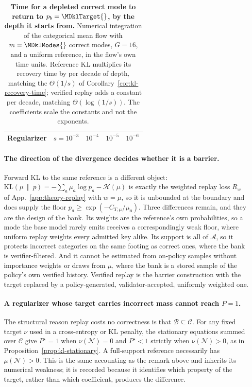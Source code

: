 \documentclass{article}
\newcommand{\1}{\mathbf 1}
\theoremstyle{remark}
\theoremstyle{definition}
\theoremstyle{plain}
\begin{document}
\begin{table}[t]
  \centering
  \caption{\textbf{Time for a depleted correct mode to return to
  $p_b=\MDklTarget{}$, by the depth it starts from.} Numerical integration of
  the categorical mean flow with $m=\MDklModes{}$ correct modes, $G=16$, and a
  uniform reference, in the flow's own time units. Reference KL multiplies its
  recovery time by \MDklDecadeKL{} per decade of depth, matching the
  $\Theta(1/s)$ of Corollary~\ref{cor:kl-recovery-time}; verified replay adds
  a constant per decade, matching $\Theta(\log(1/s))$. The coefficients scale
  the constants and not the exponents.}
  \label{tab:kl-recovery}
  \small
  \setlength{\tabcolsep}{6pt}
  \begin{tabular}{@{}lrrrr@{}}
    \toprule
    \textbf{Regularizer} & $s=10^{-3}$ & $10^{-4}$ & $10^{-5}$ & $10^{-6}$ \\
    \midrule
    
  \end{tabular}
\end{table}

\paragraph{The direction of the divergence decides whether it is a barrier.}
Forward KL to the same reference is a different object:
$\mathrm{KL}(\mu\,\|\,p)=-\sum_a\mu_a\log p_a-\mathcal H(\mu)$ is exactly the
weighted replay loss $R_w$ of
App.~\ref{app:theory-replay} with $w=\mu$, so it is unbounded at the
boundary and does supply the floor $p_a\ge\exp(-C_{T,\mu}/\mu_a)$. Three
differences remain, and they are the design of the bank. Its weights are the
reference's own probabilities, so a mode the base model rarely emits receives
a correspondingly weak floor, where uniform replay weights every admitted key
alike. Its support is all of $\mathcal A$, so it protects incorrect categories
on the same footing as correct ones, where the bank is verifier-filtered.
And it cannot be estimated from on-policy samples without importance weights or
draws from $\mu$, where the bank is a stored sample of the policy's own
verified history. Verified replay is the barrier construction with the target
replaced by a policy-generated, validator-accepted, uniformly weighted one.

\paragraph{A regularizer whose target carries incorrect mass cannot reach
$P=1$.} The structural reason replay costs no correctness is that
$\mathcal B\subseteq\mathcal C$. For any fixed target $\nu$ used in a
cross-entropy or KL penalty, the stationary equations summed over
$\mathcal C$ give $P^\star=1$ when $\nu(\mathcal N)=0$ and $P^\star<1$
strictly when $\nu(\mathcal N)>0$, as in
Proposition~\ref{prop:kl-stationary}. A full-support reference necessarily has
$\mu(\mathcal N)>0$. This is the same accounting as the remark above and
inherits its numerical weakness; it is recorded because it identifies which
property of the target, rather than which coefficient, produces the
difference.
\end{document}
